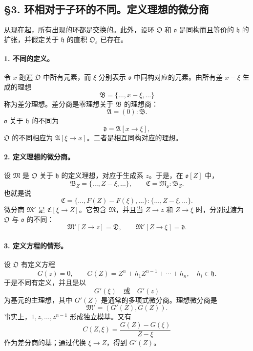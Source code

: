 \subsection*{§3. 环相对于子环的不同。定义理想的微分商}

从现在起，所有出现的环都是交换的。此外，设环 \(\mathfrak O\) 和 \(\mathfrak o\) 是同构而且等价的 \(\mathfrak h\) 的扩张，并假定关于 \(\mathfrak h\) 的直积 \(\mathfrak O_{\mathfrak o}\) 已存在。

\paragraph{1. 不同的定义。}
令 \(x\) 跑遍 \(\mathfrak O\) 中所有元素，而 \(\xi\) 分别表示 \(\mathfrak o\) 中同构对应的元素。由所有差 \(x-\xi\) 生成的理想
\[
        \mathfrak B=\{\ldots,x-\xi,\ldots\}
\]
称为差分理想。差分商是零理想关于 \(\mathfrak B\) 的理想商：
\[
        \mathfrak A=(0):\mathfrak B.
\]
\(\mathfrak o\) 关于 \(\mathfrak h\) 的不同为
\[
        \mathfrak d=\mathfrak A[x\to\xi],
\]
\(\mathfrak O\) 的不同相应为 \(\mathfrak A[\xi\to x]\)。二者是相互同构对应的理想。

\paragraph{2. 定义理想的微分商。}
设 \(\mathfrak M\) 是 \(\mathfrak O\) 关于 \(\mathfrak h\) 的定义理想，对应于生成系 \(z\)。于是，在 \(\mathfrak o[Z]\) 中，
\[
        \mathfrak B_Z=\{\ldots,Z-\xi,\ldots\},
        \qquad
        \mathfrak C=\mathfrak M_{\mathfrak o}:\mathfrak B_Z.
\]
也就是说
\[
        \mathfrak C=\{\ldots,F(Z)-F(\xi),\ldots\}:
        \{\ldots,Z-\xi,\ldots\}.
\]
微分商 \(\mathfrak M'\) 是 \(\mathfrak C[\xi\to Z]\)。它包含 \(\mathfrak M\)，并且当 \(Z\to z\) 和 \(Z\to\xi\) 时，分别过渡为 \(\mathfrak O\) 与 \(\mathfrak o\) 的不同：
\[
        \mathfrak M'[Z\to z]=\mathfrak D,
        \qquad
        \mathfrak M'[Z\to \xi]=\mathfrak d.
\]

\paragraph{3. 定义方程的情形。}
设 \(\mathfrak O\) 有定义方程
\[
        G(z)=0,\qquad
        G(Z)=Z^n+h_1Z^{n-1}+\cdots+h_n,
        \quad h_i\in\mathfrak h.
\]
于是不同有定义，并且是以
\[
        G'(\xi) \quad\text{或}\quad G'(z)
\]
为基元的主理想，其中 \(G'(Z)\) 是通常的多项式微分商。理想微分商是
\[
        \mathfrak M'=(G'(Z),G(Z)).
\]
事实上，\(1,z,\ldots,z^{n-1}\) 形成独立模基。又有
\[
        C(Z,\xi)=\frac{G(Z)-G(\xi)}{Z-\xi}
\]
作为差分商的基；通过代换 \(\xi\to Z\)，得到 \(G'(Z)\)。

